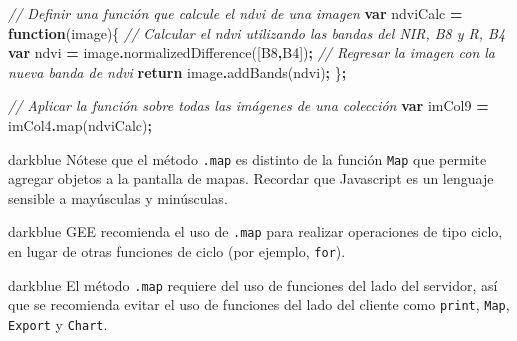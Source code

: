 \documentclass[
  12pt,
  letterpaper,
  twoside]{book}
\newenvironment{Shaded}{\begin{snugshade}}{\end{snugshade}}
\newcommand{\CommentTok}[1]{\textcolor[rgb]{0.56,0.35,0.01}{\textit{#1}}}
\newcommand{\ControlFlowTok}[1]{\textcolor[rgb]{0.13,0.29,0.53}{\textbf{#1}}}
\newcommand{\FunctionTok}[1]{\textcolor[rgb]{0.00,0.00,0.00}{#1}}
\newcommand{\KeywordTok}[1]{\textcolor[rgb]{0.13,0.29,0.53}{\textbf{#1}}}
\newcommand{\NormalTok}[1]{#1}
\newcommand{\OperatorTok}[1]{\textcolor[rgb]{0.81,0.36,0.00}{\textbf{#1}}}
\newcommand{\StringTok}[1]{\textcolor[rgb]{0.31,0.60,0.02}{#1}}
\begin{document}
\begin{Shaded}
\begin{Highlighting}[]
\CommentTok{// Definir una función que calcule el ndvi de una imagen}
\KeywordTok{var}\NormalTok{ ndviCalc }\OperatorTok{=} \KeywordTok{function}\NormalTok{(image)\{}
  \CommentTok{// Calcular el ndvi utilizando las bandas del NIR, B8 y R, B4}
  \KeywordTok{var}\NormalTok{ ndvi }\OperatorTok{=}\NormalTok{ image}\OperatorTok{.}\FunctionTok{normalizedDifference}\NormalTok{([}\StringTok{\textquotesingle{}B8\textquotesingle{}}\OperatorTok{,}\StringTok{\textquotesingle{}B4\textquotesingle{}}\NormalTok{])}\OperatorTok{;}
  \CommentTok{// Regresar la imagen con la nueva banda de ndvi}
  \ControlFlowTok{return}\NormalTok{ image}\OperatorTok{.}\FunctionTok{addBands}\NormalTok{(ndvi)}\OperatorTok{;}
\NormalTok{\}}\OperatorTok{;}

\CommentTok{// Aplicar la función sobre todas las imágenes de una colección}
\KeywordTok{var}\NormalTok{ imCol9 }\OperatorTok{=}\NormalTok{ imCol4}\OperatorTok{.}\FunctionTok{map}\NormalTok{(ndviCalc)}\OperatorTok{;}
\end{Highlighting}
\end{Shaded}

\begin{bluebox2}

\begin{awesomeblock}{5pt}{\faLightbulb}{darkblue}
Nótese que el método \texttt{.map} es distinto de la función \texttt{Map} que permite agregar objetos a la pantalla de mapas. Recordar que Javascript es un lenguaje sensible a mayúsculas y minúsculas.

\end{awesomeblock}

\end{bluebox2}

\begin{bluebox2}

\begin{awesomeblock}{5pt}{\faLightbulb}{darkblue}
GEE recomienda el uso de \texttt{.map} para realizar operaciones de tipo ciclo, en lugar de otras funciones de ciclo (por ejemplo, \texttt{for}).

\end{awesomeblock}

\end{bluebox2}

\begin{bluebox2}

\begin{awesomeblock}{5pt}{\faLightbulb}{darkblue}
El método \texttt{.map} requiere del uso de funciones del lado del servidor, así que se recomienda evitar el uso de funciones del lado del cliente como \texttt{print}, \texttt{Map}, \texttt{Export} y \texttt{Chart}.

\end{awesomeblock}

\end{bluebox2}
\end{document}
